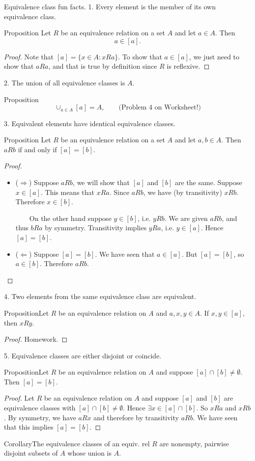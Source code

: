 \documentclass{beamer}
\def\bl[#1]#2{\begin{block}{#1}#2\end{block}}
\def\itemb{\begin{itemize}}
\def\iteme{\end{itemize}}
\begin{document}
\begin{frame}{Equivalence class fun facts.}
1. Every element is the member of its own equivalence class.
\bl[Proposition]{
Let $R$ be an equivalence relation on a set $A$ and let $a\in A$. Then 
\[a\in[a].
\]
}
\begin{proof}
Note that $[a]=\{x\in A: x R a\}$. To show that $a\in [a]$, we just need to show that $a R a$, and that is true by definition since $R$ is reflexive.
\end{proof}

2. The union of all equivalence classes is $A$.
\bl[Proposition]{
\[
\cup_{a\in A}[a]=A,\qquad \textrm{(Problem 4 on Worksheet!)}
\]
}
\end{frame}

\begin{frame}
3. Equivalent elements have identical equivalence classes.
\bl[Proposition]{
Let $R$ be an equivalence relation on a set $A$ and let $a,b\in A$. Then $a R b$ if and only if $[a]=[b]$.
}
\begin{proof}
\itemb
\item[($\Rightarrow$)] Suppose $a R b$, we will show that $[a]$ and $[b]$ are the same. Suppose $x\in[a]$. This means that $x R a$. Since $a R b$, we have (by transitivity) $x R b$. Therefore $x\in[b]$.

~~~~On the other hand suppose $y\in [b]$, i.e. $y R b$. We are given $a R b$, and thus $b R a$ by symmetry. Transitivity implies $y R a$, i.e. $y\in [a]$. Hence $[a]=[b]$.

\item[($\Leftarrow$)] Suppose $[a]=[b]$. We have seen that $a\in [a]$. But $[a]=[b]$, so $a\in [b]$. Therefore $a R b$.\qedhere
\iteme
\end{proof}
\end{frame}

\begin{frame}
4. Two elements from the same equivalence class are equivalent.
\bl[Proposition]{Let $R$ be an equivalence relation on $A$ and $a,x,y\in A$. If $x,y\in[a]$, then $x R y$.}

\begin{proof}
Homework. 
\end{proof}
\end{frame}

\begin{frame}
5. Equivalence classes are either disjoint or coincide.
\bl[Proposition]{Let $R$ be an equivalence relation on $A$ and suppose $[a]\cap[b]\neq\emptyset$. Then $[a]=[b]$.}

\begin{proof}
Let $R$ be an equivalence relation on $A$ and suppose $[a]$ and $[b]$ are equivalence classes with $[a]\cap[b]\neq \emptyset$. Hence $\exists x\in[a]\cap[b]$. So $x R a$ and $x R b$. By symmetry, we have $a R x$ and therefore by transitivity $a R b$. We have seen that this implies $[a]=[b]$.
\end{proof}


\bl[Corollary]{The equivalence classes of an equiv. rel $R$ are nonempty, pairwise disjoint subsets of $A$ whose union is $A$.}
\end{frame}
\end{document}
